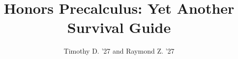 \documentclass[12pt]{scrreprt}
\begin{document}
\title{Honors Precalculus: Yet Another Survival Guide}
\author{Timothy D. '27 and Raymond Z. '27}
\maketitle

\tableofcontents















\appendix{}


\end{document}
